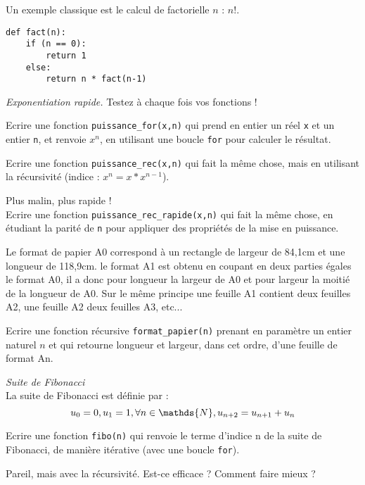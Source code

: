 


Un exemple classique est le calcul de factorielle $n$ : $n!$.
\begin{verbatim}
def fact(n):
	if (n == 0):
		return 1
	else:
		return n * fact(n-1)
\end{verbatim}

\textit{Exponentiation rapide.} Testez à chaque fois vos fonctions !

\ques Ecrire une fonction \verb!puissance_for(x,n)! qui prend en entier un réel \verb!x! et un entier \verb!n!, et renvoie $x^n$, en utilisant une boucle \verb!for! pour calculer le résultat.

\ques Ecrire une fonction \verb!puissance_rec(x,n)! qui fait la même chose, mais en utilisant la récursivité (indice : $x^n = x*x^{n-1}$).

\ques Plus malin, plus rapide !\\
Ecrire une fonction \verb!puissance_rec_rapide(x,n)! qui fait la même chose, en étudiant la parité de \verb!n! pour appliquer des propriétés de la mise en puissance.

Le format de papier A0 correspond à un rectangle de largeur de 84,1cm et une longueur de 118,9cm. le format A1 est obtenu en coupant en deux parties égales le format A0, il a donc pour longueur la largeur de A0 et pour largeur la moitié de la longueur de A0. Sur le même principe une feuille A1 contient deux feuilles A2, une feuille A2 deux feuilles A3, etc...

Ecrire une fonction récursive \verb!format_papier(n)! prenant en paramètre un entier naturel $n$ et qui retourne longueur et largeur, dans cet ordre, d'une feuille de format An.


\textit{Suite de Fibonacci}\\
La suite de Fibonacci est définie par :
\begin{equation*}
	u_0 = 0, \\
	u_1 = 1, \\
	\forall n \in \mathds{N}, u_{n+2} = u_{n+1} + u_{n}
\end{equation*}

\ques Ecrire une fonction \verb!fibo(n)! qui renvoie le terme d'indice n de la suite de Fibonacci, de manière itérative (avec une boucle \verb!for!).

\ques Pareil, mais avec la récursivité. Est-ce efficace ? Comment faire mieux ?
